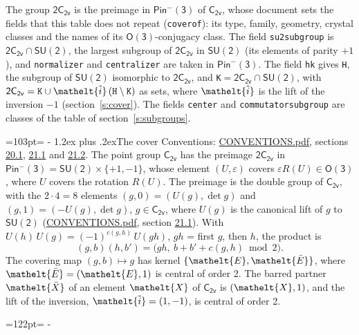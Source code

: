\documentclass[10pt,a4paper]{article}
\makeatletter
\renewcommand\section{\@startsection{section}{1}{\z@}{-3ex plus -1ex minus -.2ex}%
  {1.2ex plus .2ex}{\normalfont\large\sffamily\bfseries\color{parttitle}}}
\newcommand{\needspace}[1]{\par\penalty-100\begingroup\dimen0=#1\relax\dimen2=\pagegoal
  \advance\dimen2-\pagetotal\ifdim\dimen0>\dimen2\relax\ifdim\dimen2>0pt\vfil\break\fi\fi
  \endgroup}
\numberwithin{equation}{section}
\newcommand{\eltfont}[1]{{\let\sigma\eltsigma\mathelt{#1}}}
\newcommand{\grp}[1]{\mathsf{#1}}
\newcommand{\elt}[1]{\eltfont{#1}}
\newcommand{\dirprod}{\times}
\newcommand{\barred}[1]{\bar{#1}}
\newcommand{\lift}[1]{\tilde{#1}}
\makeatother
\begin{document}
\leavevmode\label{n:element.inversion}\label{n:group.preimage}The group $\grp{2C_{2v}}$ is the preimage in $\grp{Pin^{-}(3)}$ of \href{../../../rotation/data/pdf/C2v.pdf}{$\grp{C_{2v}}$}, whose document sets the fields that this table does not repeat (\texttt{coverof}): its type, family, geometry, crystal classes and the names of its \href{../../../rotation/data/pdf/O3.pdf}{$\grp{O(3)}$}-conjugacy class. The field \texttt{su2subgroup} is $\grp{2C_{2v}} \cap \grp{SU(2)}$, the largest subgroup of $\grp{2C_{2v}}$ in $\grp{SU(2)}$ (its elements of parity $+1$), and \texttt{normalizer} and \texttt{centralizer} are taken in $\grp{Pin^{-}(3)}$. The field \texttt{hk} gives \texttt{H}, the subgroup of $\grp{SU(2)}$ isomorphic to $\grp{2C_{2v}}$, and \texttt{K}${} = \grp{2C_{2v}} \cap \grp{SU(2)}$, with $\grp{2C_{2v}} = \texttt{K} \cup \elt{\lift{i}}\,(\texttt{H} \setminus \texttt{K})$ as sets, where $\elt{\lift{i}}$ is the lift of the inversion $-1$ (section~\ref{s:cover}). The fields \texttt{center} and \texttt{commutatorsubgroup} are classes of the table of section~\ref{s:subgroups}.
\needspace{103pt}
\section{The cover}\label{s:cover}
Conventions: \href{../../CONVENTIONS.pdf}{CONVENTIONS.pdf}, sections \href{../../CONVENTIONS.pdf\#conv.20.1}{20.1}, \href{../../CONVENTIONS.pdf\#conv.21.1}{21.1} and \href{../../CONVENTIONS.pdf\#conv.21.2}{21.2}.
\leavevmode\label{n:group.pin.minus}\label{n:group.su2}\label{n:local.pin.sign}\label{n:matrix.covered}\label{n:matrix.lift.su2}\label{n:index.bar}The point group $\grp{C_{2v}}$ has the preimage $\grp{2C_{2v}}$ in $\grp{Pin^{-}(3)} = \grp{SU(2)} \dirprod \{+1, -1\}$, whose element $(U, \varepsilon)$ covers $\varepsilon R(U) \in \grp{O(3)}$, where $U$ covers the rotation $R(U)$. The preimage is the double group of $\grp{C_{2v}}$, with the $2 \cdot 4 = 8$ elements $(g, 0) = (U(g), \det g)$ and $(g, 1) = (-U(g), \det g)$, $g \in \grp{C_{2v}}$, where $U(g)$ is the canonical lift of $g$ to $\grp{SU(2)}$ (\href{../../CONVENTIONS.pdf}{CONVENTIONS.pdf}, section \href{../../CONVENTIONS.pdf\#conv.21.1}{21.1}). \label{n:function.cocycle}With $U(h)\,U(g) = (-1)^{c(g,h)}\,U(gh)$, $gh$ = first $g$, then $h$, the product is
\begin{equation}\label{e:product}(g, b)(h, b') = \bigl(gh,\ b + b' + c(g, h) \bmod 2\bigr).\end{equation}
\leavevmode\label{n:mark.bar}The covering map $(g, b) \mapsto g$ has kernel $\{\elt{E}, \elt{\barred{E}}\}$, where $\elt{\barred{E}} = (\elt{E}, 1)$ is central of order 2. \label{n:element.named}\label{n:mark.lift}The barred partner $\elt{\barred{X}}$ of an element $\elt{X}$ of $\grp{C_{2v}}$ is $(\elt{X}, 1)$, and the lift of the inversion, $\elt{\lift{i}} = (1, -1)$, is central of order 2.
\needspace{122pt}
\end{document}
